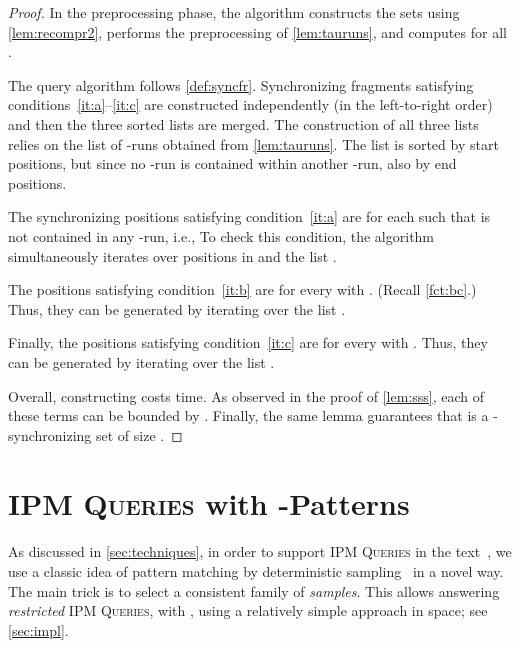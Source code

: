 \documentclass[a4paper]{article}
\theoremstyle{definition}
\theoremstyle{remark}
\newcommand{\IPM}{\textsc{IPM Queries}\xspace}
\begin{document}
\thmsss*
\begin{proof}
  In the preprocessing phase, the algorithm constructs the sets  using \cref{lem:recompr2},
  performs the preprocessing of \cref{lem:tauruns},
  and computes
   for all .

  The query algorithm follows \cref{def:syncfr}. Synchronizing fragments satisfying conditions~\ref{it:a}--\ref{it:c}
  are constructed independently (in the left-to-right order) and then the three sorted lists are merged.
  The construction of all three lists relies on the list  of -runs obtained from \cref{lem:tauruns}. The list is sorted by start positions, but since no -run is contained within another -run, also by end positions.

  The synchronizing positions satisfying condition~\ref{it:a} are  for each  such that  is not contained in any -run,
  i.e., 
  To check this condition, the algorithm simultaneously iterates over positions in  and 
  the list .

  The positions satisfying condition~\ref{it:b} are  for every  with .
  (Recall \cref{fct:bc}.)
  Thus, they can be generated by iterating over the list .

  Finally, the positions satisfying condition~\ref{it:c} are  for every  with .
  Thus, they can be generated by iterating over the list .

  Overall, constructing  costs  time.
  As observed in the proof of \cref{lem:sss}, each of these terms can be bounded by .
  Finally, the same lemma guarantees that  is a -synchronizing set of size .
\end{proof}

\section{\IPM with -Patterns}\label{chp:ipm}
\newcommand{\rx}{\hat{x}}

As discussed in \cref{sec:techniques}, in order to support \IPM in the text~, we use a classic idea of pattern matching by deterministic sampling~\cite{DBLP:journals/siamcomp/Vishkin91} in a novel way.
The main trick is to select a consistent family  of \emph{samples}.
This allows answering \emph{restricted} \IPM, with , using a relatively simple approach
in  space; see \cref{sec:impl}.
\end{document}
